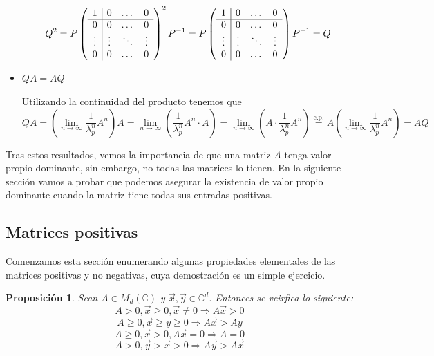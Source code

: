 \documentclass[size=a4, parskip=half, titlepage=false, toc=flat, toc=bib, 12pt]{scrartcl}
\makeatletter
\renewenvironment{proof}[1][\proofname] {\par\pushQED{\qed}\normalfont\topsep6\p@\@plus6\p@\relax\trivlist\item[\hskip\labelsep\itshape\tgpaella#1\@addpunct{.}]\ignorespaces}{\popQED\endtrivlist\@endpefalse}
\theoremstyle{theorem-style}
\newtheorem{nprop}{Proposición}[section]
\theoremstyle{definition-style}
\theoremstyle{remark-style}
\theoremstyle{example-style}
\theoremstyle{definition-style}
\theoremstyle{remark-style}
\makeatother
\begin{document}
\begin{proof}
\begin{itemize}
$$Q^2 = P \left(
      \begin{array}{{c|ccc}}
            1         &    0      &   \dots    & 0\\\hline
            0         &    0       &    \dots    & 0 \\
            \vdots    &    \vdots  &  \ddots &  \vdots \\
           0          &     0       &    \dots    & 0
      \end{array}   \right)^2 P^{-1} = P \left(
            \begin{array}{{c|ccc}}
                  1         &    0      &   \dots    & 0\\\hline
                  0         &    0       &    \dots    & 0 \\
                  \vdots    &    \vdots  &  \ddots &  \vdots \\
                 0          &     0       &    \dots    & 0
            \end{array}   \right) P^{-1} = Q $$
\item $QA = AQ$

Utilizando la continuidad del producto tenemos que
$$QA = (\lim_{n \to \infty} \frac{1}{\lambda_p^n} A^n)A = \lim_{n \to \infty} (\frac{1}{\lambda_p^n} A^n \cdot A) = \lim_{n \to \infty} (A \cdot \frac{1}{\lambda_p^n} A^n) \overset{\textrm{c.p.}} = A ( \lim_{n \to \infty} \frac{1}{\lambda_p^n} A^n) = AQ$$

\end{itemize}
\end{proof}

Tras estos resultados, vemos la importancia de que una matriz $A$ tenga valor propio dominante, sin embargo, no todas las matrices lo tienen. En la siguiente sección vamos a probar que podemos asegurar la existencia de valor propio dominante cuando la matriz tiene todas sus entradas positivas.

\subsection{Matrices positivas}

Comenzamos esta sección enumerando algunas propiedades elementales de las matrices positivas y no negativas, cuya demostración es un simple ejercicio.

\begin{nprop}
Sean $A \in M_d(\mathbb{C})$ y $\vec{x},\vec{y} \in \mathbb{C}^d$. Entonces se veirfica lo siguiente:
\begin{equation}\label{eq1} A > 0, \vec{x} \geq 0, \vec{x} \neq 0 \Rightarrow A \vec{x} > 0 \end{equation}
\begin{equation} A \geq 0, \vec{x} \geq y \geq 0 \Rightarrow A \vec{x} > Ay \end{equation}
\begin{equation} A \geq 0, \vec{x} > 0, A \vec{x} = 0 \Rightarrow A = 0 \end{equation}
\begin{equation} \label{eq4} A > 0, \vec{y} > \vec{x} > 0 \Rightarrow A\vec{y} > A\vec{x} \end{equation}
\end{nprop}
\end{document}
